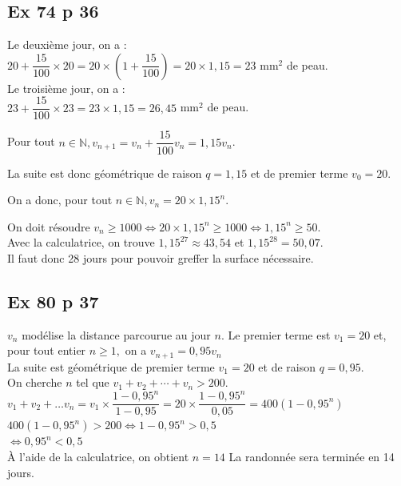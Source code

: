 \documentclass[a4paper,french]{book}
\begin{document}
\subsection*{Ex 74 p 36}
\begin{enumMet}
    \item Le deuxième jour, on a :\\
$20+\dfrac{15}{100} \times 20=20 \times\left(1+\dfrac{15}{100}\right)=20 \times 1,15=23$ mm$^2$ de peau.\\
Le troisième jour, on a :\\
$23+\dfrac{15}{100} \times 23=23 \times 1,15=26,45$ mm$^2$ de peau.\\
\item Pour tout $n \in \mathbb{N}, v_{n+1}=v_{n}+\dfrac{15}{100} v_{n}=1,15 v_{n}$.
\item La suite est donc géométrique de raison $q=1,15$ et de premier terme $v_{0}=20$.
\item On a donc, pour tout $n \in \mathbb{N}, v_{n}=20 \times 1,15^{n}$.
\item On doit résoudre $v_{n} \geq 1000 \iff 20 \times 1,15^{n} \geq 1000 \iff 1,15^{n} \geq 50$.\\
Avec la calculatrice, on trouve $1,15^{27} \approx 43,54$ et $1,15^{28}=50,07$.\\
Il faut donc 28 jours pour pouvoir greffer la surface nécessaire.
\end{enumMet}

\subsection*{Ex 80 p 37}
    $v_{n}$ modélise la distance parcourue au jour $n$. Le premier terme est $v_{1}=20$ et, pour tout entier $n \geqslant 1,$ on a $v_{n+1}=0,95 v_{n}$\\
    La suite est géométrique de premier terme $v_{1}=20$ et de raison $q=0,95$.\\
    On cherche $n$ tel que $v_{1}+v_{2}+\cdots+v_{n}>200$.\\
    $v_{1}+v_{2}+\ldots v_{n}=v_{1} \times \dfrac{1-0,95^{n}}{1-0,95}=20 \times \dfrac{1-0,95^{n}}{0,05}=400\left(1-0,95^{n}\right)$\\
    $400\left(1-0,95^{n}\right)>200 \Longleftrightarrow 1-0,95^{n}>0,5$\\
    $\Longleftrightarrow 0,95^{n}<0,5$\\
    À l'aide de la calculatrice, on obtient $n=14$ La randonnée sera terminée en 14 jours.
\end{document}
